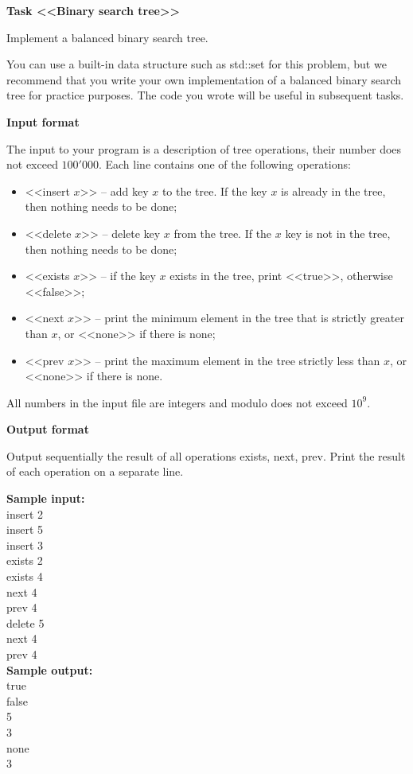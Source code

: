 \documentclass[a4paper]{article}
\begin{document}
\textbf{Task <<Binary search tree>>}

Implement a balanced binary search tree.

You can use a built-in data structure such as std::set for this problem, but we recommend that you write your own implementation of a balanced binary search tree for practice purposes. The code you wrote will be useful in subsequent tasks.

\SPACE

\textbf{Input format}

The input to your program is a description of tree operations, their number does not exceed $100'000$. Each line contains one of the following operations:
\begin{itemize}
\item <<insert $x$>> -- add key $x$ to the tree. If the key $x$ is already in the tree, then nothing needs to be done;
\item <<delete $x$>> -- delete key $x$ from the tree. If the $x$ key is not in the tree, then nothing needs to be done;
\item <<exists $x$>> -- if the key $x$ exists in the tree, print <<true>>, otherwise <<false>>;
\item <<next $x$>> -- print the minimum element in the tree that is strictly greater than $x$, or <<none>> if there is none;
\item <<prev $x$>> -- print the maximum element in the tree strictly less than $x$, or <<none>> if there is none.
\end{itemize}

All numbers in the input file are integers and modulo does not exceed $10^9$.

\SPACE

\textbf{Output format}

Output sequentially the result of all operations exists, next, prev. Print the result of each operation on a separate line.

\LINE

\noindent \textbf{Sample input:}\\
insert 2\\
insert 5\\
insert 3\\
exists 2\\
exists 4\\
next 4\\
prev 4\\
delete 5\\
next 4\\
prev 4\\

\noindent \textbf{Sample output:}\\
true\\
false\\
5\\
3\\
none\\
3\\
\end{document}
